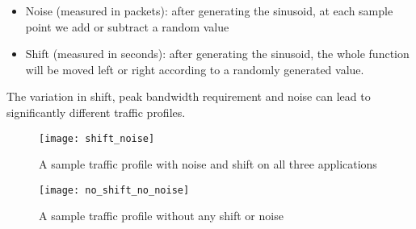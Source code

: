 \begin{itemize}
	\item Noise (measured in packets): after generating the sinusoid, at each sample 
	point we add or subtract a random value
	\item Shift (measured in seconds): after generating the sinusoid, the whole function will be moved left or right according to a randomly generated value.
\end{itemize}

The variation in shift, peak bandwidth requirement and noise can lead to significantly different traffic profiles. 


\begin{figure}[h!]
	\texttt{[image: shift\_noise]}
	\caption{A sample traffic profile with noise and shift on all three applications}	
	\centering
\end{figure}

\begin{figure}[h!]
	\texttt{[image: no\_shift\_no\_noise]}
	\caption{A sample traffic profile without any shift or noise}	
	\centering
\end{figure}

\pagebreak

